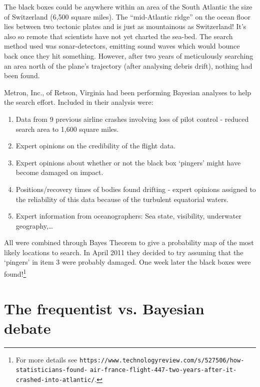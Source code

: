 The black boxes could be anywhere within an area of the South Atlantic the size of Switzerland (6,500 square miles).
The ``mid-Atlantic ridge'' on the ocean floor lies between two tectonic plates and is just as mountainous as Switzerland!
It's also so remote that scientists have not yet charted the sea-bed.
The search method used was sonar-detectors, emitting sound waves which would bounce back once they hit something.
However, after two years of meticulously searching an area north of the plane’s trajectory (after analysing debris drift), nothing had been found.

Metron, Inc., of Retson, Virginia had been performing Bayesian analyses to help the search effort.
Included in their analysis were:
\begin{enumerate}
\item
Data from 9 previous airline crashes involving loss of pilot
control - reduced search area to 1,600 square miles.
\item
Expert opinions on the credibility of the flight data.
\item
Expert opinions about whether or not the black box
`pingers' might have become damaged on impact.
\item
Positions/recovery times of bodies found drifting - expert
opinions assigned to the reliability of this data because of
the turbulent equatorial waters.
\item
Expert information from oceanographers: Sea state,
visibility, underwater geography,\ldots
\end{enumerate}
All were combined through Bayes Theorem to give a probability map of the most likely locations to search.
In April 2011 they decided to try assuming that the `pingers' in item 3 were probably damaged.
One week later the black boxes were found!\footnote{
For more details see \texttt{https://www.technologyreview.com/s/527506/how-statisticians-found-}
\texttt{air-france-flight-447-two-years-after-it-crashed-into-atlantic/}.
}

\section*{The frequentist vs. Bayesian debate}

